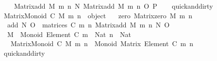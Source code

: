 \begin{isabellebody}
\ \ \ \ Matrix{\isacharunderscore}{\kern0pt}add\ M\ m\ n\ N\ {\isacharparenleft}{\kern0pt}Matrix{\isacharunderscore}{\kern0pt}add\ M\ m\ n\ O\ P{\isacharparenright}{\kern0pt}{\isachardoublequoteclose}\isanewline
%
\isadelimproof
\ \ %
\endisadelimproof
%
\isatagproof
{}\isamarkupfalse%
\ {\isacharbrackleft}{\kern0pt}{\isacharbrackleft}{\kern0pt}quick{\isacharunderscore}{\kern0pt}and{\isacharunderscore}{\kern0pt}dirty{\isacharbrackright}{\kern0pt}{\isacharbrackright}{\kern0pt}\isanewline
\ \ \isamarkupfalse%
%
\endisatagproof
{\isafoldproof}%
%
\isadelimproof
\isanewline
%
\endisadelimproof
\ \ \isanewline
\isanewline
{}\isamarkupfalse%
\ {\isachardoublequoteopen}Matrix{\isacharunderscore}{\kern0pt}Monoid\ C\ M\ m\ n\ {\isasymequiv}\ object\ {\isacharbraceleft}{\kern0pt}\isanewline
\ \ {\isasymlangle}{\isacharat}{\kern0pt}zero{\isacharcomma}{\kern0pt}\ Matrix{\isacharunderscore}{\kern0pt}zero\ M\ m\ n{\isasymrangle}{\isacharcomma}{\kern0pt}\isanewline
\ \ {\isasymlangle}{\isacharat}{\kern0pt}add{\isacharcomma}{\kern0pt}\ {\isasymlambda}N\ O\ {\isasymin}\ matrices\ C\ m\ n{\isachardot}{\kern0pt}\ Matrix{\isacharunderscore}{\kern0pt}add\ M\ m\ n\ N\ O{\isasymrangle}\isanewline
{\isacharbraceright}{\kern0pt}{\isachardoublequoteclose}\isanewline
\isanewline
\isanewline
{}\isamarkupfalse%
\ \ {\isachardoublequoteopen}M\ {\isacharcolon}{\kern0pt}\ Monoid\ {\isacharparenleft}{\kern0pt}Element\ C{\isacharparenright}{\kern0pt}{\isachardoublequoteclose}\ {\isachardoublequoteopen}m\ {\isacharcolon}{\kern0pt}\ Nat{\isachardoublequoteclose}\ {\isachardoublequoteopen}n\ {\isacharcolon}{\kern0pt}\ Nat{\isachardoublequoteclose}\isanewline
\ \ \ {\isachardoublequoteopen}Matrix{\isacharunderscore}{\kern0pt}Monoid\ C\ M\ m\ n\ {\isacharcolon}{\kern0pt}\ Monoid\ {\isacharparenleft}{\kern0pt}Matrix\ {\isacharparenleft}{\kern0pt}Element\ C{\isacharparenright}{\kern0pt}\ m\ n{\isacharparenright}{\kern0pt}{\isachardoublequoteclose}\isanewline
%
\isadelimproof
\ \ %
\endisadelimproof
%
\isatagproof
{}\isamarkupfalse%
\ {\isacharbrackleft}{\kern0pt}{\isacharbrackleft}{\kern0pt}quick{\isacharunderscore}{\kern0pt}and{\isacharunderscore}{\kern0pt}dirty{\isacharbrackright}{\kern0pt}{\isacharbrackright}{\kern0pt}\isanewline
\ \ \isamarkupfalse%
%
\endisatagproof
{\isafoldproof}%
%
\isadelimproof
%
\endisadelimproof
%
\isadelimdocument
%
\endisadelimdocument
%
\isatagdocument
%
\isamarkuptrue%
%
\endisatagdocument

\end{isabellebody}
